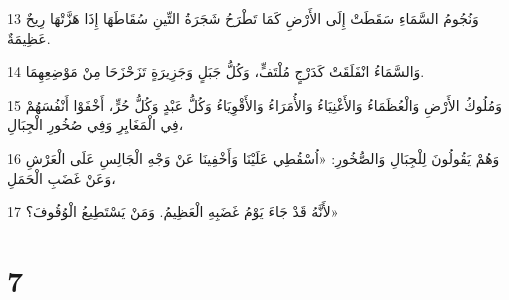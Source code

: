 \par 13 وَنُجُومُ السَّمَاءِ سَقَطَتْ إِلَى الأَرْضِ كَمَا تَطْرَحُ شَجَرَةُ التِّينِ سُقَاطَهَا إِذَا هَزَّتْهَا رِيحٌ عَظِيمَةٌ.
\par 14 وَالسَّمَاءُ انْفَلَقَتْ كَدَرْجٍ مُلْتَفٍّ، وَكُلُّ جَبَلٍ وَجَزِيرَةٍ تَزَحْزَحَا مِنْ مَوْضِعِهِمَا.
\par 15 وَمُلُوكُ الأَرْضِ وَالْعُظَمَاءُ وَالأَغْنِيَاءُ وَالأُمَرَاءُ وَالأَقْوِيَاءُ وَكُلُّ عَبْدٍ وَكُلُّ حُرٍّ، أَخْفَوْا أَنْفُسَهُمْ فِي الْمَغَايِرِ وَفِي صُخُورِ الْجِبَالِ،
\par 16 وَهُمْ يَقُولُونَ لِلْجِبَالِ وَالصُّخُورِ: «اُسْقُطِي عَلَيْنَا وَأَخْفِينَا عَنْ وَجْهِ الْجَالِسِ عَلَى الْعَرْشِ وَعَنْ غَضَبِ الْحَمَلِ،
\par 17 لأَنَّهُ قَدْ جَاءَ يَوْمُ غَضَبِهِ الْعَظِيمُ. وَمَنْ يَسْتَطِيعُ الْوُقُوفَ؟»

\chapter{7}

